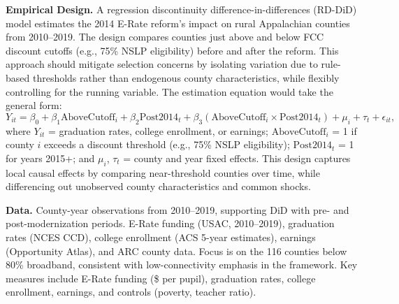 \textbf{Empirical Design.} A regression discontinuity difference-in-differences (RD-DiD) model estimates the 2014 E-Rate reform’s impact on rural Appalachian counties from 2010–2019. The design compares counties just above and below FCC discount cutoffs (e.g., 75\% NSLP eligibility) before and after the reform. This approach should mitigate selection concerns by isolating variation due to rule-based thresholds rather than endogenous county characteristics, while flexibly controlling for the running variable. The estimation equation would take the general form:
\[Y_{it} = \beta_0 + \beta_1 \text{AboveCutoff}_i + \beta_2 \text{Post2014}_t + \beta_3 (\text{AboveCutoff}_i \times \text{Post2014}_t)  + \mu_i + \tau_t + \epsilon_{it},\]
where $Y_{it}$ = graduation rates, college enrollment, or earnings; $\text{AboveCutoff}_i$ = 1 if county $i$ exceeds a discount threshold (e.g., 75\% NSLP eligibility); $\text{Post2014}_t$ = 1 for years 2015+; and $\mu_i$, $\tau_t$ = county and year fixed effects. This design captures local causal effects by comparing near-threshold counties over time, while differencing out unobserved county characteristics and common shocks. 

\textbf{Data.} County-year observations from 2010–2019, supporting DiD with pre- and post-modernization periods. E-Rate funding (USAC, 2010–2019), graduation rates (NCES CCD), college enrollment (ACS 5-year estimates), earnings (Opportunity Atlas), and ARC county data. Focus is on the 116 counties below 80\% broadband, consistent with low-connectivity emphasis in the framework. Key measures include E-Rate funding (\$ per pupil), graduation rates, college enrollment, earnings, and controls (poverty, teacher ratio).



